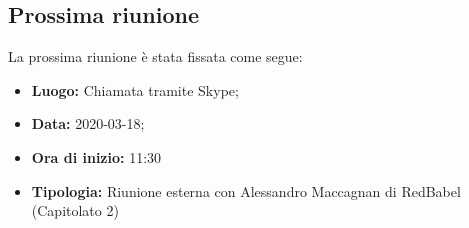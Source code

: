 	\subsection{Prossima riunione}
		La prossima riunione è stata fissata come segue: 
		\begin{itemize}
			\item \textbf{Luogo: } Chiamata tramite Skype; 
			\item \textbf{Data: } 2020-03-18; 
			\item \textbf{Ora di inizio: } 11:30
			\item \textbf{Tipologia: } Riunione esterna con Alessandro Maccagnan di RedBabel (Capitolato 2)
		\end{itemize}